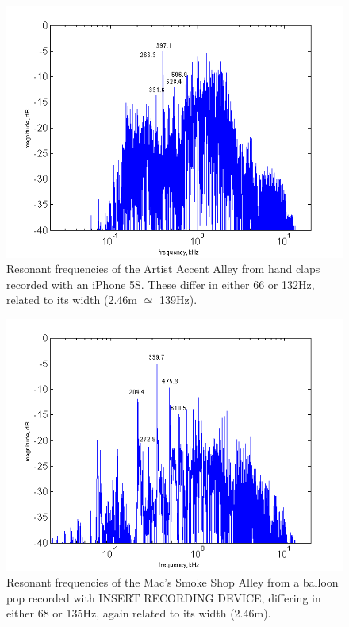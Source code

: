 \documentclass{aes137}
\begin{document}
\begin{figure}[h!] \centering \includegraphics[width=\linewidth]{images/artists_labeled_IR.png} \caption{Resonant frequencies of the Artist Accent Alley from hand claps recorded with an iPhone 5S. These differ in either 66 or 132Hz, related to its width (2.46m $\simeq$ 139Hz).} \end{figure}

\begin{figure}[h!] \centering \includegraphics[width=\linewidth]{images/macs_labeled_IR.png} \caption{Resonant frequencies of the Mac's Smoke Shop Alley from a balloon pop recorded with INSERT RECORDING DEVICE, differing in either 68 or 135Hz, again related to its width (2.46m).} \end{figure}
\end{document}
